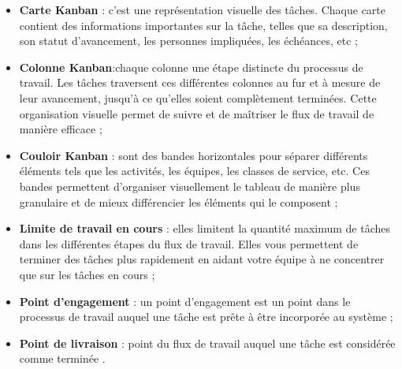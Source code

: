 \begin{itemize}
    \item{\textbf{Carte Kanban}} : c'est une représentation visuelle des tâches. Chaque carte contient des informations importantes sur la tâche, telles que sa description, son statut d'avancement, les personnes impliquées, 
    les échéances, etc\cite{tableau} ;
    \item {\textbf{Colonne Kanban}}:chaque colonne une étape distincte du processus de travail. Les tâches traversent ces différentes colonnes au fur et à mesure 
    de leur avancement, jusqu'à ce qu'elles soient complètement terminées. Cette organisation visuelle permet de suivre et de maîtriser le flux de travail de manière efficace \cite{tableau} ;

    \item{\textbf{Couloir Kanban}} : sont des bandes horizontales pour séparer différents éléments tels que les activités, les équipes, les classes de service, etc.
     Ces bandes permettent d'organiser visuellement le tableau de manière plus granulaire et de mieux différencier les éléments qui le composent \cite{tableau} ;

     \item{\textbf{Limite de travail en cours}} : elles limitent la quantité maximum de tâches dans les différentes étapes du flux de travail.
      Elles vous permettent de terminer des tâches plus rapidement en aidant votre équipe à ne concentrer que sur les tâches en cours \cite{tableau};

    \item{\textbf{Point d'engagement}} : un point d'engagement est un point dans le processus de travail auquel une tâche est prête à être incorporée au système \cite{tableau} ;
    \item{\textbf{Point de livraison }} : point du flux de travail auquel une tâche est considérée comme terminée \cite{tableau}.
\end{itemize}
